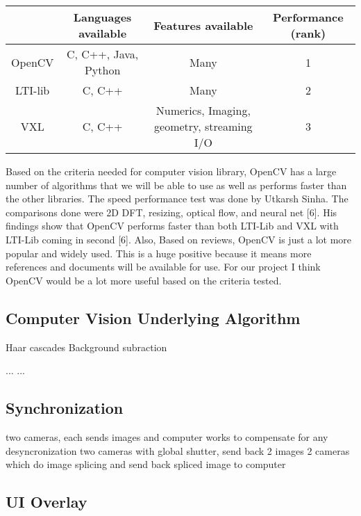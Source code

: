 \documentclass[letterpaper,10pt,onecolumn,draftclsnofoot]{IEEEtran}
\begin{document}
\begin{center}
	\begin{tabular}{|c|c|c|c|}
		
		\hline
		\textbf{} & \textbf{Languages available} & \textbf{Features available} & \textbf{Performance (rank)} \\
		\hline
		OpenCV & C, C++, Java, Python & Many & 1 \\
		\hline
		LTI-lib & C, C++ & Many & 2 \\
		\hline
		VXL & C, C++ & Numerics, Imaging, geometry, streaming I/O & 3 \\
		\hline
		
	\end{tabular}
\end{center}

Based on the criteria needed for computer vision library, OpenCV has a large number of algorithms that we will be able to use as well as performs faster than the other libraries.
The speed performance test was done by Utkarsh Sinha.
The comparisons done were 2D DFT, resizing, optical flow, and neural net [6].
His findings show that OpenCV performs faster than both LTI-Lib and VXL with LTI-Lib coming in second [6].
Also, Based on reviews, OpenCV is just a lot more popular and widely used.
This is a huge positive because it means more references and documents will be available for use.
For our project I think OpenCV would be a lot more useful based on the criteria tested.

\newpage
\subsection{Computer Vision Underlying Algorithm} %

Haar cascades
Background subraction

...
...

\newpage
\subsection{Synchronization} %

two cameras, each sends images and computer works to compensate for any desyncronization
two cameras with global shutter, send back 2 images
2 cameras which do image splicing and send back spliced image to computer


\newpage
\subsection{UI Overlay} %
\end{document}
